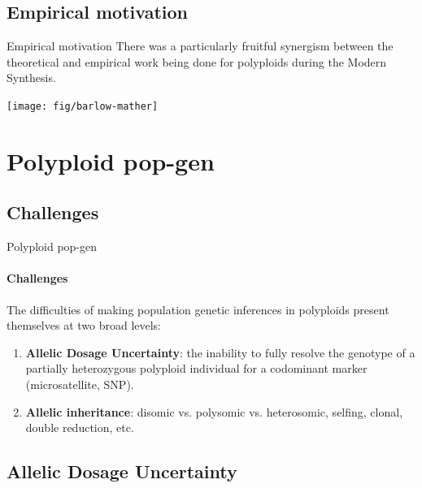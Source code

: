 \documentclass[presentation]{beamer}
\begin{document}
\subsection{Empirical motivation}

\begin{frame}[t]{Empirical motivation}
	There was a particularly fruitful synergism between the theoretical and empirical work being done for polyploids during the Modern Synthesis.
	\vspace{0.1in}
	
	\begin{center}
		\texttt{[image: fig/barlow-mather]}
	\end{center}
\end{frame}

\section{Polyploid pop-gen}

\subsection{Challenges}

\begin{frame}[t]{Polyploid pop-gen}
\framesubtitle{Challenges}
	The difficulties of making population genetic inferences in polyploids present themselves at two broad levels:
	\vspace{0.1in}
	
	\begin{enumerate}
		\item \textbf{Allelic Dosage Uncertainty}: the inability to fully resolve the genotype of a partially heterozygous polyploid individual for a codominant marker (microsatellite, SNP).
		\vspace{0.2in}
		
		\item \textbf{Allelic inheritance}: disomic vs. polysomic vs. heterosomic, selfing, clonal, double reduction, etc.
	\end{enumerate}


\end{frame}

\subsection{Allelic Dosage Uncertainty}
\end{document}
